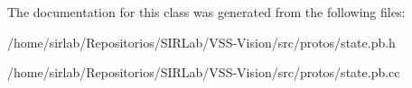 The documentation for this class was generated from the following files\-:\begin{DoxyCompactItemize}
\item 
/home/sirlab/\-Repositorios/\-S\-I\-R\-Lab/\-V\-S\-S-\/\-Vision/src/protos/state.\-pb.\-h\item 
/home/sirlab/\-Repositorios/\-S\-I\-R\-Lab/\-V\-S\-S-\/\-Vision/src/protos/state.\-pb.\-cc\end{DoxyCompactItemize}

